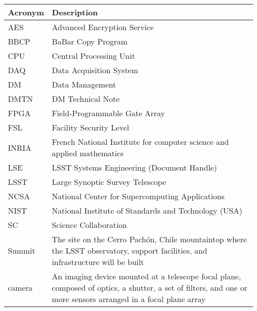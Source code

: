 \addtocounter{table}{-1}
\begin{longtable}{|p{}|p{}|}\hline
\textbf{Acronym} & \textbf{Description}  \\\hline

AES & Advanced Encryption Service \\\hline
BBCP & BaBar Copy Program \\\hline
CPU & Central Processing Unit \\\hline
DAQ & Data Acquisition System \\\hline
DM & Data Management \\\hline
DMTN & DM Technical Note \\\hline
FPGA & Field-Programmable Gate Array \\\hline
FSL & Facility Security Level \\\hline
INRIA & French National Institute for computer science and applied mathematics \\\hline
LSE & LSST Systems Engineering (Document Handle) \\\hline
LSST & Large Synoptic Survey Telescope \\\hline
NCSA & National Center for Supercomputing Applications \\\hline
NIST & National Institute of Standards and Technology (USA) \\\hline
SC & Science Collaboration \\\hline
Summit & The site on the Cerro Pachón, Chile mountaintop where the LSST observatory, support facilities, and infrastructure will be built \\\hline
camera & An imaging device mounted at a telescope focal plane, composed of optics, a shutter, a set of filters, and one or more sensors arranged in a focal plane array \\\hline
\end{longtable}
